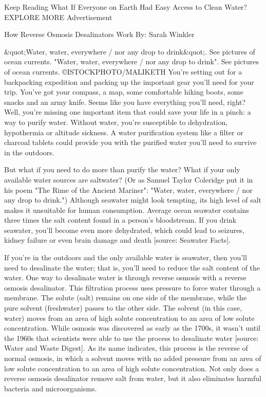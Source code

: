 Keep Reading
What If Everyone on Earth Had Easy Access to Clean Water?
EXPLORE MORE
Advertisement


How Reverse Osmosis Desalinators Work
By: Sarah Winkler

&quot;Water, water, everywhere / nor any drop to drink&quot;. See pictures of ocean currents.
"Water, water, everywhere / nor any drop to drink". See pictures of ocean currents.
©ISTOCKPHOTO/MALIKETH
You're setting out for a backpacking expedition and packing up the important gear you'll need for your trip. You've got your compass, a map, some comfortable hiking boots, some snacks and an army knife. Seems like you have everything you'll need, right? Well, you're missing one important item that could save your life in a pinch: a way to purify water. Without water, you're susceptible to dehydration, hypothermia or altitude sickness. A water purification system like a filter or charcoal tablets could provide you with the purified water you'll need to survive in the outdoors.

But what if you need to do more than purify the water? What if your only available water sources are saltwater? (Or as Samuel Taylor Coleridge put it in his poem "The Rime of the Ancient Mariner": "Water, water, everywhere / nor any drop to drink.") Although seawater might look tempting, its high level of salt makes it unsuitable for human consumption. Average ocean seawater contains three times the salt content found in a person's bloodstream. If you drink seawater, you'll become even more dehydrated, which could lead to seizures, kidney failure or even brain damage and death [source: Seawater Facts].

If you're in the outdoors and the only available water is seawater, then you'll need to desalinate the water; that is, you'll need to reduce the salt content of the water. One way to desalinate water is through reverse osmosis with a reverse osmosis desalinator. This filtration process uses pressure to force water through a membrane. The solute (salt) remains on one side of the membrane, while the pure solvent (freshwater) passes to the other side. The solvent (in this case, water) moves from an area of high solute concentration to an area of low solute concentration. While osmosis was discovered as early as the 1700s, it wasn't until the 1960s that scientists were able to use the process to desalinate water [source: Water and Waste Digest]. As its name indicates, this process is the reverse of normal osmosis, in which a solvent moves with no added pressure from an area of low solute concentration to an area of high solute concentration. Not only does a reverse osmosis desalinator remove salt from water, but it also eliminates harmful bacteria and microorganisms.

